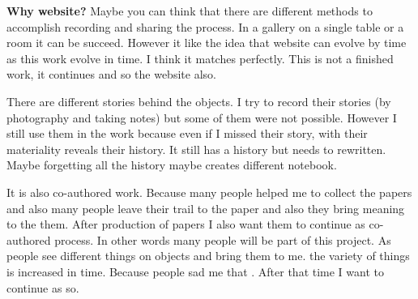 \textbf{Why website?} Maybe you can think that there are different methods to accomplish recording and sharing the process. In a gallery on a single table or a room it can be succeed. However it like the idea that website can evolve by time as this work evolve in time. I think it matches perfectly. This is not a finished work, it continues and so the website also. 

There are different stories behind the objects. I try to record their stories (by photography and taking notes) but some of them were not possible. However I still use them in the work because even if I missed their story, with their materiality reveals their history. It still has a history but needs to rewritten. Maybe forgetting all the history maybe creates different notebook.

It is also co-authored work. Because many people helped me to collect the papers and also many people leave their trail to the paper and also they bring meaning to the them. After production of papers I also want them to continue as co-authored process. In other words many people will be part of this project. As people see different things on objects and bring them to me. the variety of things is increased in time. Because people sad me that . After that time I want to continue as so. 



